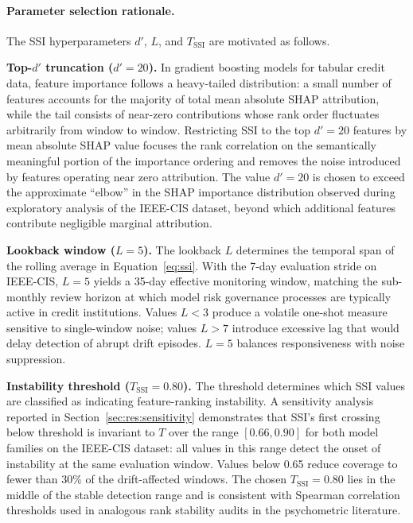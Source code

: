 \documentclass[pdflatex,sn-mathphys-num]{sn-jnl}
\theoremstyle{thmstyleone}
\theoremstyle{thmstyletwo}
\theoremstyle{thmstylethree}
\begin{document}
\paragraph{Parameter selection rationale.}
The SSI hyperparameters $d'$, $L$, and $T_{\mathrm{SSI}}$ are motivated
as follows.

\textbf{Top-$d'$ truncation ($d' = 20$).} In gradient boosting models for
tabular credit data, feature importance follows a heavy-tailed distribution:
a small number of features accounts for the majority of total mean absolute
SHAP attribution, while the tail consists of near-zero contributions whose
rank order fluctuates arbitrarily from window to window. Restricting SSI to
the top $d' = 20$ features by mean absolute SHAP value focuses the rank
correlation on the semantically meaningful portion of the importance ordering
and removes the noise introduced by features operating near zero attribution.
The value $d' = 20$ is chosen to exceed the approximate ``elbow'' in the
SHAP importance distribution observed during exploratory analysis of the
IEEE-CIS dataset, beyond which additional features contribute negligible
marginal attribution.

\textbf{Lookback window ($L = 5$).} The lookback $L$ determines the temporal
span of the rolling average in Equation~\eqref{eq:ssi}. With the 7-day
evaluation stride on IEEE-CIS, $L = 5$ yields a 35-day effective monitoring
window, matching the sub-monthly review horizon at which model risk governance
processes are typically active in credit institutions. Values $L < 3$ produce
a volatile one-shot measure sensitive to single-window noise; values $L > 7$
introduce excessive lag that would delay detection of abrupt drift episodes.
$L = 5$ balances responsiveness with noise suppression.

\textbf{Instability threshold ($T_{\mathrm{SSI}} = 0.80$).} The threshold
determines which SSI values are classified as indicating feature-ranking
instability. A sensitivity analysis reported in
Section~\ref{sec:res:sensitivity} demonstrates that SSI's first crossing
below threshold is invariant to $T$ over the range $[0.66, 0.90]$ for both
model families on the IEEE-CIS dataset: all values in this range detect the
onset of instability at the same evaluation window. Values below 0.65 reduce
coverage to fewer than 30\% of the drift-affected windows. The chosen
$T_{\mathrm{SSI}} = 0.80$ lies in the middle of the stable detection range
and is consistent with Spearman correlation thresholds used in analogous rank
stability audits in the psychometric literature.
\end{document}
